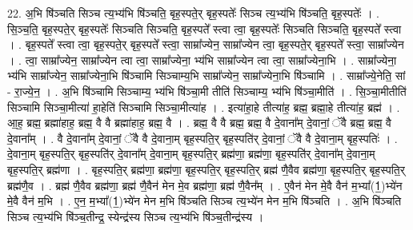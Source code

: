 \documentclass[17pt]{extarticle}
\begin{document}
22. अ॒भि षि॑ञ्चति सिञ्च त्य॒भ्य॑भि षि॑ञ्चति॒ बृह॒स्पते॒र् बृह॒स्पतेः᳚ सिञ्च त्य॒भ्य॑भि षि॑ञ्चति॒ बृह॒स्पतेः᳚ । . सि॒ञ्च॒ति॒ बृह॒स्पते॒र् बृह॒स्पतेः᳚ सिञ्चति सिञ्चति॒ बृह॒स्पते᳚ स्त्वा त्वा॒ बृह॒स्पतेः᳚ सिञ्चति सिञ्चति॒ बृह॒स्पते᳚ स्त्वा । . बृह॒स्पते᳚ स्त्वा त्वा॒ बृह॒स्पते॒र् बृह॒स्पते᳚ स्त्वा॒ साम्रा᳚ज्येन॒ साम्रा᳚ज्येन त्वा॒ बृह॒स्पते॒र् बृह॒स्पते᳚ स्त्वा॒ साम्रा᳚ज्येन । . त्वा॒ साम्रा᳚ज्येन॒ साम्रा᳚ज्येन त्वा त्वा॒ साम्रा᳚ज्येना॒ भ्य॑भि साम्रा᳚ज्येन त्वा त्वा॒ साम्रा᳚ज्येना॒भि । . साम्रा᳚ज्येना॒ भ्य॑भि साम्रा᳚ज्येन॒ साम्रा᳚ज्येना॒भि षि॑ञ्चामि सिञ्चाम्य॒भि साम्रा᳚ज्येन॒ साम्रा᳚ज्येना॒भि षि॑ञ्चामि । . साम्रा᳚ज्ये॒नेति॒ सां - रा॒ज्ये॒न॒ । . अ॒भि षि॑ञ्चामि सिञ्चाम्य॒ भ्य॑भि षि॑ञ्चा॒मी तीति॑ सिञ्चाम्य॒ भ्य॑भि षि॑ञ्चा॒मीति॑ । . सि॒ञ्चा॒मीतीति॑ सिञ्चामि सिञ्चा॒मीत्या॑ हा॒हेति॑ सिञ्चामि सिञ्चा॒मीत्या॑ह । . इत्या॑हा॒हे तीत्या॑ह॒ ब्रह्म॒ ब्रह्मा॒हे तीत्या॑ह॒ ब्रह्म॑ । . आ॒ह॒ ब्रह्म॒ ब्रह्मा॑हाह॒ ब्रह्म॒ वै वै ब्रह्मा॑हाह॒ ब्रह्म॒ वै । . ब्रह्म॒ वै वै ब्रह्म॒ ब्रह्म॒ वै दे॒वाना᳚म् दे॒वानां॒ ॅवै ब्रह्म॒ ब्रह्म॒ वै दे॒वाना᳚म् । . वै दे॒वाना᳚म् दे॒वानां॒ ॅवै वै दे॒वाना॒म् बृह॒स्पति॒र् बृह॒स्पति॑र् दे॒वानां॒ ॅवै वै दे॒वाना॒म् बृह॒स्पतिः॑ । . दे॒वाना॒म् बृह॒स्पति॒र् बृह॒स्पति॑र् दे॒वाना᳚म् दे॒वाना॒म् बृह॒स्पति॒र् ब्रह्म॑णा॒ ब्रह्म॑णा॒ बृह॒स्पति॑र् दे॒वाना᳚म् दे॒वाना॒म् बृह॒स्पति॒र् ब्रह्म॑णा । . बृह॒स्पति॒र् ब्रह्म॑णा॒ ब्रह्म॑णा॒ बृह॒स्पति॒र् बृह॒स्पति॒र् ब्रह्म॑ णै॒वैव ब्रह्म॑णा॒ बृह॒स्पति॒र् बृह॒स्पति॒र् ब्रह्म॑णै॒व । . ब्रह्म॑ णै॒वैव ब्रह्म॑णा॒ ब्रह्म॑ णै॒वैन॑ मेन मे॒व ब्रह्म॑णा॒ ब्रह्म॑ णै॒वैन᳚म् । . ए॒वैन॑ मेन मे॒वै वैन॑ म॒भ्या᳚(1॒)भ्ये॑न मे॒वै वैन॑ म॒भि । . ए॒न॒ म॒भ्या᳚(1॒)भ्ये॑न मेन म॒भि षि॑ञ्चति सिञ्च त्य॒भ्ये॑न मेन म॒भि षि॑ञ्चति । . अ॒भि षि॑ञ्चति सिञ्च त्य॒भ्य॑भि षि॑ञ्च॒तीन्द्र॒ स्येन्द्र॑स्य सिञ्च त्य॒भ्य॑भि षि॑ञ्च॒तीन्द्र॑स्य । \newline
\end{document}

